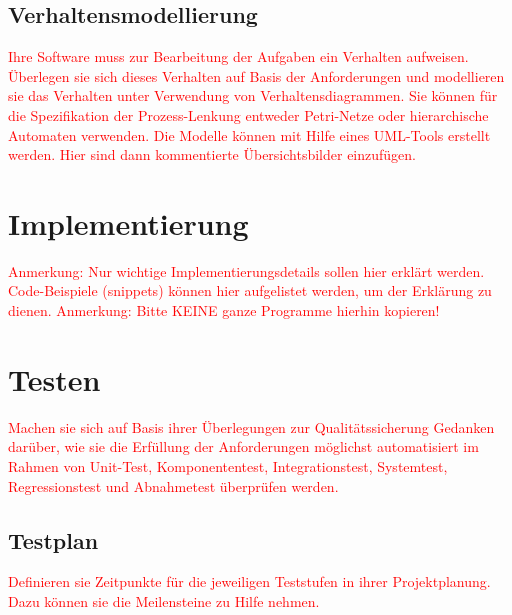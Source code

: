 \documentclass[a4paper, 11pt]{article}
\begin{document}
\subsection{Verhaltensmodellierung}
\textcolor{red}{Ihre Software muss zur Bearbeitung der Aufgaben ein Verhalten aufweisen. Überlegen sie sich dieses Verhalten auf Basis der Anforderungen und modellieren sie das Verhalten unter Verwendung von Verhaltensdiagrammen. Sie können für die Spezifikation der Prozess-Lenkung entweder Petri-Netze oder hierarchische Automaten verwenden. Die Modelle können mit Hilfe eines UML-Tools erstellt werden. Hier sind dann kommentierte Übersichtsbilder einzufügen.}

\section{Implementierung}
\textcolor{red}{Anmerkung: Nur wichtige Implementierungsdetails sollen hier erklärt werden. Code-Beispiele (snippets) können hier aufgelistet werden, um der Erklärung zu dienen. 
Anmerkung: Bitte KEINE ganze Programme hierhin kopieren!
}

\section{Testen}
\textcolor{red}{Machen sie sich auf Basis ihrer Überlegungen zur Qualitätssicherung Gedanken darüber, wie sie die Erfüllung der Anforderungen möglichst automatisiert im Rahmen von Unit-Test, Komponententest, Integrationstest, Systemtest, Regressionstest und Abnahmetest überprüfen werden.}

\subsection{Testplan}
\textcolor{red}{Definieren sie Zeitpunkte für die jeweiligen Teststufen in ihrer Projektplanung. Dazu können sie die Meilensteine zu Hilfe nehmen.}

\newpage
\end{document}
